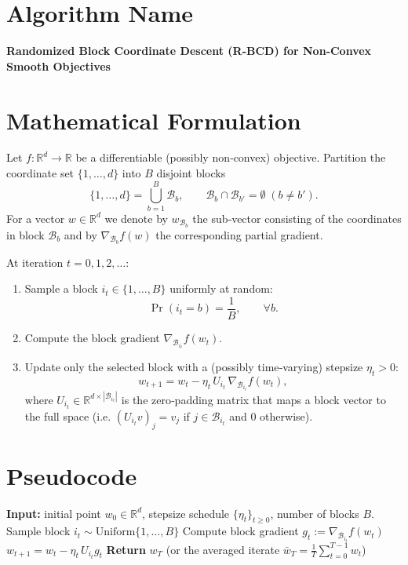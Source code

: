 \documentclass[11pt]{article}
\newcommand{\R}{\mathbb{R}}
\newcommand{\block}[1]{\mathcal{B}_{#1}}
\begin{document}
\section*{Algorithm Name}
\textbf{Randomized Block Coordinate Descent (R‑BCD) for Non‑Convex Smooth Objectives}

\section*{Mathematical Formulation}
Let $f:\R^{d}\rightarrow\R$ be a differentiable (possibly non‑convex) objective.  
Partition the coordinate set $\{1,\dots ,d\}$ into $B$ disjoint blocks 
\[
\{1,\dots ,d\}= \bigcup_{b=1}^{B}\block{b},\qquad 
\block{b}\cap\block{b'}=\emptyset\;(b\neq b').
\]
For a vector $w\in\R^{d}$ we denote by $w_{\block{b}}$ the sub‑vector consisting of the coordinates in block $\block{b}$ and by $\nabla_{\block{b}} f(w)$ the corresponding partial gradient.

At iteration $t=0,1,2,\dots$:

\begin{enumerate}
\item Sample a block $i_{t}\in\{1,\dots ,B\}$ uniformly at random:
\[
\Pr(i_{t}=b)=\frac{1}{B},\qquad \forall b.
\]
\item Compute the block gradient $\nabla_{\block{i_t}} f(w_t)$.
\item Update only the selected block with a (possibly time‑varying) stepsize $\eta_t>0$:
\[
w_{t+1}= w_t - \eta_t \, U_{i_t}\,\nabla_{\block{i_t}} f(w_t),
\]
where $U_{i_t}\in\R^{d\times |\block{i_t}|}$ is the zero‑padding matrix that maps a block vector to the full space (i.e. $(U_{i_t}v)_{j}=v_{j}$ if $j\in\block{i_t}$ and $0$ otherwise).
\end{enumerate}

\section*{Pseudocode}
\begin{algorithm}[H]
\caption{Randomized Block Coordinate Descent (R‑BCD)}
\begin{algorithmic}[1]
\STATE \textbf{Input:} initial point $w_{0}\in\R^{d}$, stepsize schedule $\{\eta_t\}_{t\ge 0}$, number of blocks $B$.
    \STATE Sample block $i_t\sim\text{Uniform}\{1,\dots ,B\}$ \hfill{}
    \STATE Compute block gradient $g_t:=\nabla_{\block{i_t}} f(w_t)$
    \STATE $w_{t+1}= w_t - \eta_t\,U_{i_t} g_t$ \hfill{}
\ENDFOR
\STATE \textbf{Return} $w_T$ (or the averaged iterate $\bar w_T=\frac{1}{T}\sum_{t=0}^{T-1}w_t$)
\end{algorithmic}
\end{algorithm}
\end{document}
